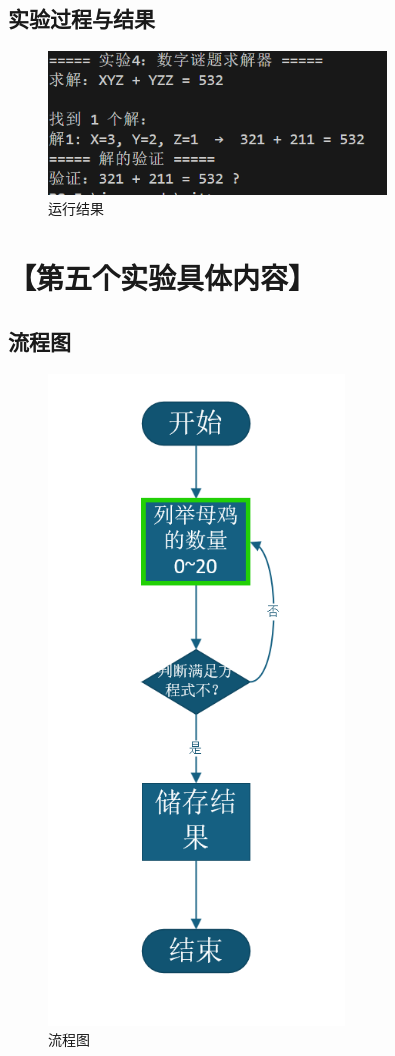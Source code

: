 \documentclass[12pt,a4paper]{article}
\begin{document}
\subsection*{实验过程与结果}

\begin{figure}[H]
\centering
\includegraphics[width=0.8\textwidth]{four.png}
\caption{运行结果}
\end{figure}

\section*{【第五个实验具体内容】}
\subsection*{流程图}

\begin{figure}[H]
\centering
\includegraphics[width=0.7\textwidth]{five1.png}
\caption{流程图}
\end{figure}
\end{document}
